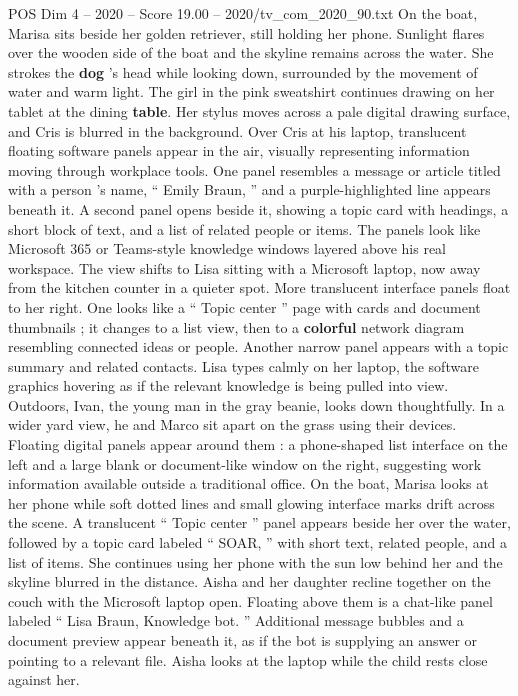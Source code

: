 \begin{textsample}{POS Dim 4 – 2020 – Score 19.00 – 2020/tv\_com\_2020\_90.txt}
On the boat, Marisa sits beside her golden retriever, still holding her phone.
Sunlight flares over the wooden side of the boat and the skyline remains across the water.
She strokes the \textbf{dog} ’s head while looking down, surrounded by the movement of water and warm light.
The girl in the pink sweatshirt continues drawing on her tablet at the dining \textbf{table}.
Her stylus moves across a pale digital drawing surface, and Cris is blurred in the background.
Over Cris at his laptop, translucent floating software panels appear in the air, visually representing information moving through workplace tools.
One panel resembles a message or article titled with a person ’s name, “ Emily Braun, ” and a purple-highlighted line appears beneath it.
A second panel opens beside it, showing a topic card with headings, a short block of text, and a list of related people or items.
The panels look like Microsoft 365 or Teams-style knowledge windows layered above his real workspace.
The view shifts to Lisa sitting with a Microsoft laptop, now away from the kitchen counter in a quieter spot.
More translucent interface panels float to her right.
One looks like a “ Topic center ” page with cards and document thumbnails ; it changes to a list view, then to a \textbf{colorful} network diagram resembling connected ideas or people.
Another narrow panel appears with a topic summary and related contacts.
Lisa types calmly on her laptop, the software graphics hovering as if the relevant knowledge is being pulled into view.
Outdoors, Ivan, the young man in the gray beanie, looks down thoughtfully.
In a wider yard view, he and Marco sit apart on the grass using their devices.
Floating digital panels appear around them : a phone-shaped list interface on the left and a large blank or document-like window on the right, suggesting work information available outside a traditional office.
On the boat, Marisa looks at her phone while soft dotted lines and small glowing interface marks drift across the scene.
A translucent “ Topic center ” panel appears beside her over the water, followed by a topic card labeled “ SOAR, ” with short text, related people, and a list of items.
She continues using her phone with the sun low behind her and the skyline blurred in the distance.
Aisha and her daughter recline together on the couch with the Microsoft laptop open.
Floating above them is a chat-like panel labeled “ Lisa Braun, Knowledge bot. ” Additional message bubbles and a document preview appear beneath it, as if the bot is supplying an answer or pointing to a relevant file.
Aisha looks at the laptop while the child rests close against her.

\end{textsample}
